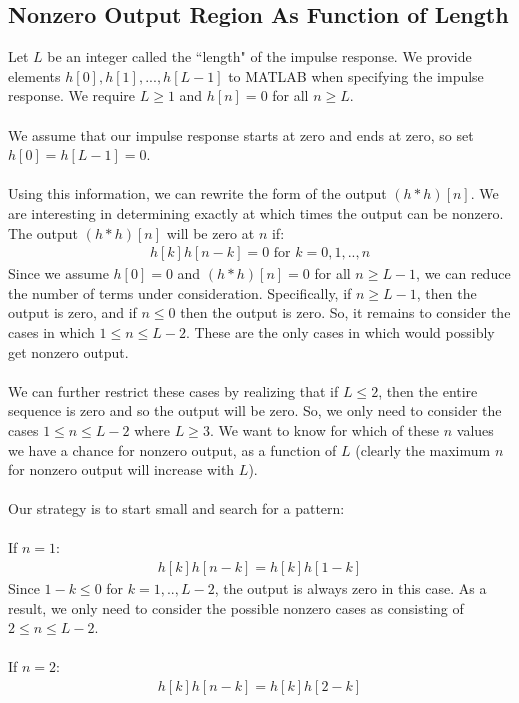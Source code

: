 \documentclass[a4paper]{article}
\begin{document}
\subsection*{Nonzero Output Region As Function of Length}
Let $L$ be an integer called the ``length" of the impulse response. We provide elements $h[0], h[1], ..., h[L-1]$ to MATLAB when specifying the impulse response. We require $L \geq 1$ and $h[n] = 0$ for all $n \geq L$.
\\\\
We assume that our impulse response starts at zero and ends at zero, so set $h[0] = h[L-1] = 0$.
\\\\
Using this information, we can rewrite the form of the output $(h*h)[n]$. We are interesting in determining exactly at which times the output can be nonzero. The output $(h*h)[n]$ will be zero at $n$ if:
\begin{align*}
h[k]h[n-k] = 0 \text{ for } k = 0,1,..,n
\end{align*}
Since we assume $h[0] = 0$ and $(h*h)[n] = 0$ for all $n \geq L -1$, we can reduce the number of terms under consideration. Specifically, if $n \geq L-1$, then the output is zero, and if $n \leq 0$ then the output is zero. So, it remains to consider the cases in which $1 \leq n \leq L -2$. These are the only cases in which would possibly get nonzero output.
\\\\ 
We can further restrict these cases by realizing that if $L \leq 2$, then the entire sequence is zero and so the output will be zero. So, we only need to consider the cases $1 \leq n \leq L -2$ where $L \geq 3$. We want to know for which of these $n$ values we have a chance for nonzero output, as a function of $L$ (clearly the maximum $n$ for nonzero output will increase with $L$).
\\\\
Our strategy is to start small and search for a pattern:
\\\\
If $n = 1$:
\begin{align*}
h[k]h[n-k] = h[k]h[1-k]
\end{align*}
Since $1 - k \leq 0$ for $k = 1,..,L-2$, the output is always zero in this case. As a result, we only need to consider the possible nonzero cases as consisting of $2 \leq n \leq L -2$.
\\\\
If $n = 2$:
\begin{align*}
h[k]h[n-k] = h[k]h[2-k] \\
\end{align*}
\end{document}

